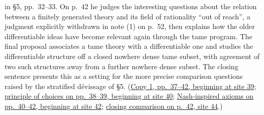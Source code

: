 in \S5, pp.~32--33. On p.~42 he judges the interesting questions about
the relation between a finitely generated theory and its field of
rationality ``out of reach'', a judgment explicitly withdrawn in note (1)
on p.~52, then explains how the older differentiable
ideas have become relevant again through the tame program. The final
proposal associates a tame theory with a differentiable one and studies
the differentiable structure off a closed nowhere dense tame subset,
with agreement of two such structures away from a further nowhere dense
subset. The closing sentence presents this as a setting for the more
precise comparison questions raised by the stratified dévissage of \S5.
(\href{https://grothendieck.umontpellier.fr/web/viewer.html?file=../119.pdf\#page=40}{Copy 1, pp.~37--42, beginning at site 39};
\href{https://grothendieck.umontpellier.fr/web/viewer.html?file=../119.pdf\#page=41}{principle of choices on pp.~38--39, beginning at site 40};
\href{https://grothendieck.umontpellier.fr/web/viewer.html?file=../119.pdf\#page=43}{Nash-inspired axioms on pp.~40--42, beginning at site 42};
\href{https://grothendieck.umontpellier.fr/web/viewer.html?file=../119.pdf\#page=45}{closing comparison on p.~42, site 44}.)
